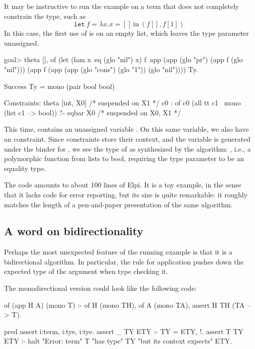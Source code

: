 \documentclass[a4paper, 11pt]{book}
\begin{document}
It may be instructive to run the example on a term that does not completely
constrain the type, such as
$$
\mathtt{let}\ f = \lambda x. x = []\ \mathrm{in}\ (f [], f [1])
$$
In this case, the first use of  is on an empty list, which leaves the
type parameter unassigned.
\begin{elpicode}
goal> theta [],
  of (let (lam x\ eq (glo "nil") x) f\
        app (app (glo "pr")
          (app f (glo "nil")))
          (app f (app (app (glo "cons") (glo "1")) (glo "nil"))))
     Ty.

Success
  Ty = mono (pair bool bool)
 
Constraints:
 theta [int, X0] 
   /* suspended on X1 */
 {c0} : of c0 (all tt c1 \ mono (list c1 --> bool)) ?- eqbar X0 
   /* suspended on X0, X1 */
\end{elpicode}
This time,  contains an unassigned variable . On this same
variable, we also have an \elpi{eqbar} constraint. Since constraints store their
context, and the variable is generated under the binder for , we see
the type of \elpi{f} as synthesized by the algorithm: ,
i.e., a polymorphic function from lists to bool, requiring the type parameter to
be an equality type.

The code amounts to about 100 lines of Elpi. It is a toy example, in the sense
that it lacks code for error reporting, but its size is quite remarkable: it
roughly matches the length of a pen-and-paper presentation of the same
algorithm.

\subsection{A word on bidirectionality}

Perhaps the most unexpected feature of the running example is that it is a
bidirectional algorithm. In particular, the rule for application pushes down
the expected type of the argument when type checking it.

The monodirectional version could look like the following code:

\begin{elpicode}
of (app H A) (mono T) :-
  of H (mono TH),
  of A (mono TA),
  assert H TH (TA --> T).

pred assert i:term, i:tye, i:tye.
assert _ TY ETY :- TY = ETY, !.
assert T TY ETY :-
  halt "Error: term" T "has type" TY "but its context expects" ETY.
\end{elpicode}
\end{document}
